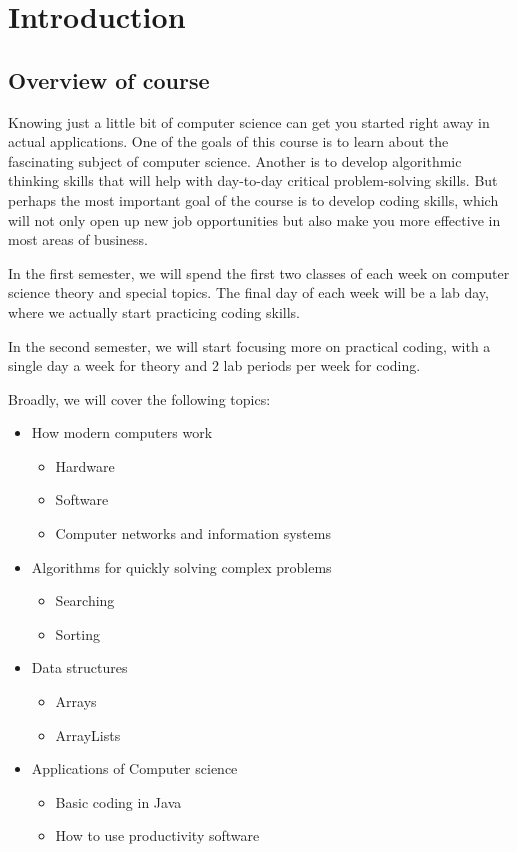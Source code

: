 \chapter{Introduction}

\section{Overview of course}

Knowing just a little bit of computer science can get you started right away in actual applications. One of the goals of this course is to learn about the fascinating subject of computer science. Another is to develop algorithmic thinking skills that will help with day-to-day critical problem-solving skills. But perhaps the most important goal of the course is to develop coding skills, which will not only open up new job opportunities but also make you more effective in most areas of business. 

In the first semester, we will spend the first two classes of each week on computer science theory and special topics. The final day of each week will be a lab day, where we actually start practicing coding skills. 

In the second semester, we will start focusing more on practical coding, with a single day a week for theory and 2 lab periods per week for coding. 

Broadly, we will cover the following topics:
\begin{itemize}
    \item How modern computers work
    	\begin{itemize}
       		\item Hardware
       		\item Software
       		\item Computer networks and information systems
    	\end{itemize}
    \item Algorithms for quickly solving complex problems
    	\begin{itemize}
       		\item Searching
       		\item Sorting
    	\end{itemize}
    \item Data structures 
    	\begin{itemize}
       		\item Arrays
       		\item ArrayLists
    	\end{itemize}
    \item Applications of Computer science
    	\begin{itemize}
       		\item Basic coding in Java
       		\item How to use productivity software
    	\end{itemize}
\end{itemize}

